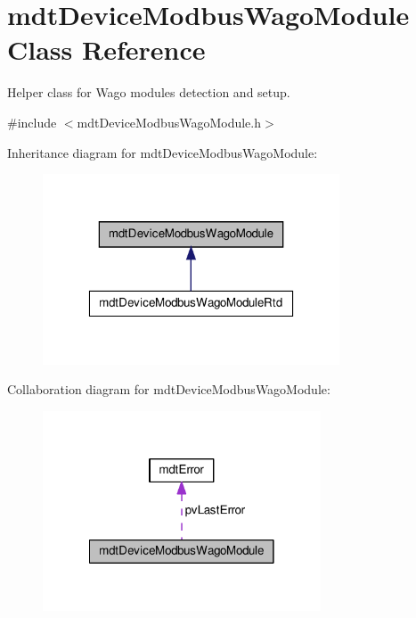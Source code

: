 \hypertarget{classmdt_device_modbus_wago_module}{\section{mdt\-Device\-Modbus\-Wago\-Module Class Reference}
\label{classmdt_device_modbus_wago_module}
}


Helper class for Wago modules detection and setup.  




{\ttfamily \#include $<$mdt\-Device\-Modbus\-Wago\-Module.\-h$>$}



Inheritance diagram for mdt\-Device\-Modbus\-Wago\-Module\-:\nopagebreak
\begin{figure}[H]
\begin{center}
\leavevmode
\includegraphics[width=250pt]{classmdt_device_modbus_wago_module__inherit__graph}
\end{center}
\end{figure}


Collaboration diagram for mdt\-Device\-Modbus\-Wago\-Module\-:
\nopagebreak
\begin{figure}[H]
\begin{center}
\leavevmode
\includegraphics[width=234pt]{classmdt_device_modbus_wago_module__coll__graph}
\end{center}
\end{figure}
